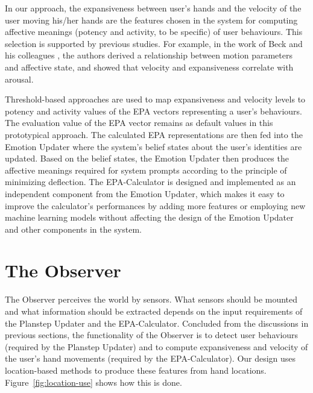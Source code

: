 In our approach, the expansiveness between user's hands and the velocity of the user moving his/her hands are the features chosen in the system for computing affective meanings (potency and activity, to be specific) of user behaviours. This selection is supported by previous studies. For example, in the work of Beck and his colleagues \cite{beck2010interpretation}, the authors derived a relationship between motion parameters and affective state, and showed that velocity and expansiveness correlate with arousal.

Threshold-based approaches are used to map expansiveness and velocity levels to potency and activity values of the EPA vectors representing a user's behaviours. The evaluation value of the EPA vector remains as default values in this prototypical approach. The calculated EPA representations are then fed into the Emotion Updater where the system's belief states about the user's identities are updated. Based on the belief states, the Emotion Updater then produces the affective meanings required for system prompts according to the principle of minimizing deflection. The EPA-Calculator is designed and implemented as an independent component from the Emotion Updater, which makes it easy to improve the calculator's performances by adding more features or employing new machine learning models without affecting the design of the Emotion Updater and other components in the system.

\section{The Observer}
\label{sec:design-observer}

The Observer perceives the world by sensors. What sensors should be mounted and what information should be extracted depends on the input requirements of the Planstep Updater and the EPA-Calculator. Concluded from the discussions in previous sections, the functionality of the Observer is to detect user behaviours (required by the Planstep Updater) and to compute expansiveness and velocity of the user's hand movements (required by the EPA-Calculator). Our design uses location-based methods to produce these features from hand locations. Figure~\ref{fig:location-use} shows how this is done.

